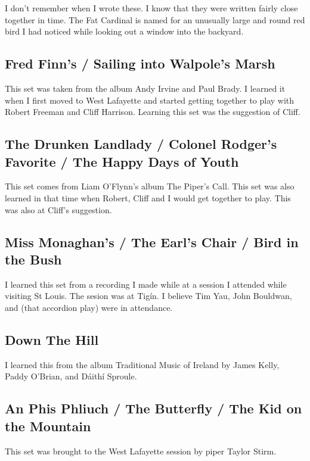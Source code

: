 \documentclass[11pt,letterpaper]{article}
\begin{document}
I don't remember when I wrote these. I know that they were written fairly close together in time. The Fat Cardinal is named for an unusually large and round red bird I had noticed while looking out a window into the backyard.

\subsection*{Fred Finn's / Sailing into Walpole's Marsh}

This set was taken from the album Andy Irvine and Paul Brady. I learned it when I first moved to West Lafayette and started getting together to play with Robert Freeman and Cliff Harrison. Learning this set was the suggestion of Cliff. 

\subsection*{The Drunken Landlady / Colonel Rodger's Favorite / The Happy Days of Youth}

This set comes from Liam O'Flynn's album The Piper's Call. This set was also learned in that time when Robert, Cliff and I would get together to play. This was also at Cliff's suggestion.

\subsection*{Miss Monaghan's / The Earl's Chair / Bird in the Bush}

I learned this set from a recording I made while at a session I attended while visiting St Louis. The sesion was at Tig\'in. I believe Tim Yau, John Bouldwan, and (that accordion play) were in attendance.

\subsection*{Down The Hill}

I learned this from the album Traditional Music of Ireland by James Kelly, Paddy O'Brian, and D\'aith\'i Sproule.

\subsection*{An Phis Phliuch / The Butterfly / The Kid on the Mountain}

This set was brought to the West Lafayette session by piper Taylor Stirm.
\end{document}
